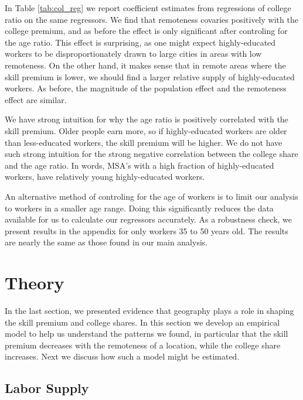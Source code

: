 \documentclass{article}
\begin{document}
In Table \ref{tab:col_reg} we report coefficient estimates from regressions of college ratio on the same regressors.  We find that remoteness covaries positively with the college premium, and as before the effect is only significant after controling for the age ratio.  This effect is surprising, as one might expect highly-educated workers to be disproportionately drawn to large cities in areas with low remoteness.  On the other hand, it makes sense that in remote areas where the skill premium is lower, we should find a larger relative supply of highly-educated workers.  As before, the magnitude of the population effect and the remoteness effect are similar.

We have strong intuition for why the age ratio is positively correlated with the skill premium.  Older people earn more, so if highly-educated workers are older than less-educated workers, the skill premium will be higher.  We do not have such strong intuition for the strong negative correlation between the college share and the age ratio.  In words, MSA's with a high fraction of highly-educated workers, have relatively young highly-educated workers.

An alternative method of controling for the age of workers is to limit our analysis to workers in a smaller age range.  Doing this significantly reduces the data available for us to calculate our regressors accurately.  As a robustness check, we present results in the appendix for only workers 35 to 50 years old.  The results are nearly the same as those found in our main analysis.

\section{Theory}

In the last section, we presented evidence that geography plays a role in shaping the skill premium and college shares.  In this section we develop an empirical model to help us understand the patterns we found, in particular that the skill premium decreases with the remoteness of a location, while the college share increases.  Next we discuss how such a model might be estimated.

\subsection{Labor Supply}
\end{document}
